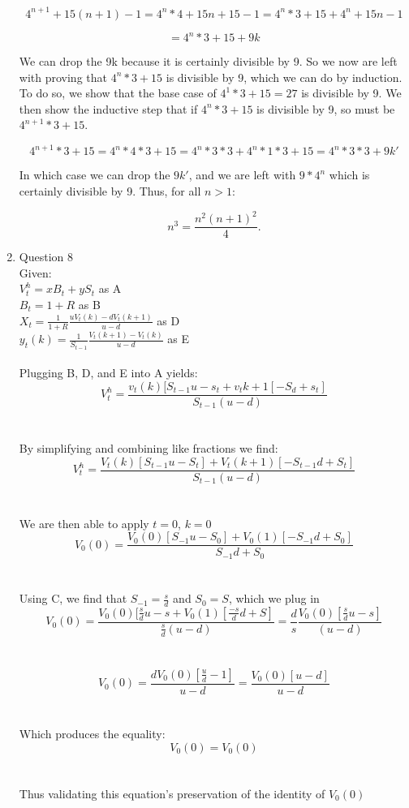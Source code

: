 \documentclass[]{book}
\theoremstyle{definition}
\begin{document}
\begin{enumerate}
$$4^{n+1} + 15(n+1) - 1 =  4^n*4 + 15n+15 - 1 =  4^n*3+15 + 4^n + 15n - 1$$

$$=4^n*3+15 +9k $$

We can drop the 9k because it is certainly divisible by 9.  So we now are left with proving that $4^n*3+15$ is divisible by 9, which we can do by induction. To do so, we show that the base case of $4^1*3 + 15 = 27$ is divisible by 9.  We then show the inductive step that if $4^n * 3 + 15$ is divisible by 9, so must be $4^{n+1} * 3 + 15$.

$$4^{n+1} * 3 + 15 = 4^n * 4 * 3 + 15 = 4^n * 3 * 3 + 4^n * 1 * 3 + 15 = 4^n * 3 * 3 + 9k'$$

In which case we can drop the $9k'$, and we are left with $9 * 4^n$ which is certainly divisible by 9. Thus, for all $n>1$:

$$n^3 = \frac{n^2(n+1)^2}{4}.$$




\item Question 8\\
Given:\\
$V_t^h=xB_t+yS_t$ as A\\
$B_t=1+R$ as B\\
$X_t=\frac{1}{1+R}\frac{uV_t(k)-dV_t(k+1)}{u-d}$ as D\\
$y_t(k)=\frac{1}{S_{t-1}}\frac{V_t(k+1)-V_t(k)}{u-d}$ as E\\
\\
Plugging B, D, and E into A yields:\\
$$V_t^h=\frac{v_t(k)[S_{t-1}u-s_t+v_t{k+1}[-S_d+s_t]}{S_{t-1}(u-d)}$$\\
\\
By simplifying and combining like fractions we find:\\
$$V_t^h=\frac{V_t(k)[S_{t-1}u-S_t]+V_t(k+1)[-S_{t-1}d+S_t]}{S_{t-1}(u-d)}$$\\
\\
We are then able to apply $t=0$, $k=0$\\
$$V_0(0)=\frac{V_0(0)[S_{-1}u-S_0]+V_0(1)[-S_{-1}d+S_0]}{S_{-1}d+S_0}$$\\
\\
Using C, we find that $S_{-1}=\frac{s}{d}$ and $S_0=S$, which we plug in\\
$$V_0(0)=\frac{V_0(0)[\frac{s}{d}u-s+V_0(1)[\frac{-s}{d}d+S]}{\frac{s}{d}(u-d)}=\frac{d}{s}\frac{V_0(0)[\frac{s}{d}u-s]}{(u-d)}$$\\
\\
$$V_0(0)=\frac{dV_0(0)[\frac{u}{d}-1]}{u-d}=\frac{V_0(0)[u-d]}{u-d}$$\\
\\
Which produces the equality:\\
$$V_0(0)=V_0(0)$$\\
\\
Thus validating this equation's preservation of the identity of $V_0(0)$\\







\end{enumerate}
\end{document}
